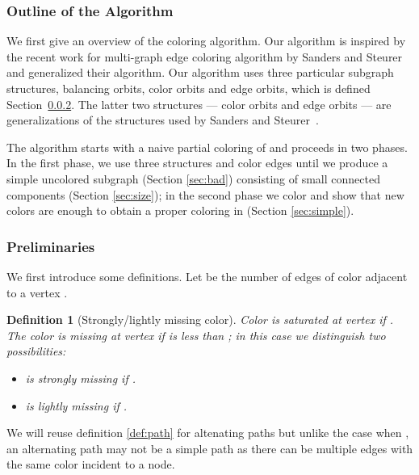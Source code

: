 \documentclass[titlepage, 11pt]{article}
\newtheorem{definition}{Definition}
\begin{document}
\subsubsection{Outline of the Algorithm}
We first  give an overview of the coloring algorithm. 
Our algorithm is inspired by the recent work for multi-graph edge coloring algorithm by
Sanders and Steurer~\cite{sanders05} and generalized their algorithm.
Our algorithm uses three particular subgraph structures, balancing orbits, color orbits and edge orbits,
which is defined Section~\ref{sec:struct}. 
The latter two structures --- color orbits and edge orbits --- are generalizations of 
the structures used by Sanders and Steurer~\cite{sanders05}.
\iffalse
In Section~\ref{sec:alg} we describe the algorithm in detail and, in Section~\ref{sec:analysis}, show that it uses at most  colors.
\fi

The algorithm starts with a naive partial coloring of  and proceeds in two phases. 
In the first phase, we use three structures and color edges until we produce 
a simple uncolored subgraph   (Section \ref{sec:bad})
consisting of small connected components (Section \ref{sec:size}); in the second phase 
we color  and show that  new colors
are enough to obtain a proper coloring in  (Section \ref{sec:simple}).

\subsubsection{Preliminaries} \label{sec:struct}

We first introduce some definitions.
Let  be the number of edges of color  adjacent to a vertex .
\begin{definition}[Strongly/lightly missing color]
Color  is \emph{saturated} at vertex  if . The color  is \emph{missing} at vertex  if  is less than ; in this case we distinguish two possibilities: 
\begin{itemize}
\item  is \emph{strongly missing} if . 
\item  is \emph{lightly missing} if .
\end{itemize}
\end{definition} 



We will reuse definition \ref{def:path} for altenating paths but  unlike the case when , an alternating path may not be a simple path  as there can be multiple edges with the same color incident to a node.
\end{document}
